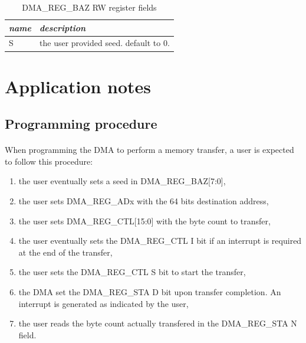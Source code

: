 \documentclass[a4paper, 11pt]{article}
\begin{document}
\begin{table}[!h]
\centering
\begin{scriptsize}
\begin{tabular}{|p{1cm}|p{12cm}|}
  \hline
  \textit{name} & \textit{description} \\
  \hline
  S
  &
  the user provided seed. default to 0. \\
  \hline
\end{tabular}
\end{scriptsize}
\caption{\tiny{DMA\_REG\_BAZ RW register fields}}
\label{tab:dma_reg_baz_fields}
\end{table}


\newpage
\section{Application notes}

\subsection{Programming procedure}
\paragraph{}
When programming the DMA to perform a memory transfer, a user is expected to
follow this procedure:
\begin{enumerate}
\item the user eventually sets a seed in DMA\_REG\_BAZ[7:0],
\item the user sets DMA\_REG\_ADx with the 64 bits destination address,
\item the user sets DMA\_REG\_CTL[15:0] with the byte count to transfer,
\item the user eventually sets the DMA\_REG\_CTL I bit if an interrupt is
required at the end of the transfer,
\item the user sets the DMA\_REG\_CTL S bit to start the transfer,
\item the DMA set the DMA\_REG\_STA D bit upon transfer completion. An interrupt
is generated as indicated by the user,
\item the user reads the byte count actually transfered in the DMA\_REG\_STA
N field.
\end{enumerate}
\end{document}
